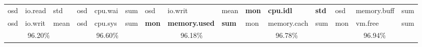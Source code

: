 \begin{table*}[t!]
{\begin{tabular}{|lll|lll|lll|lll|lll|}
osd  & io.read       & std  & osd  & cpu.wai       & sum  & osd   & io.writ        & mean   & \textbf{mon}    & \textbf{cpu.idl}         & \textbf{std}    & osd    & memory.buff     & sum    \\
osd  & io.writ       & mean & osd  & cpu.sys       & sum  & \textbf{mon}   & \textbf{memory.used}    & \textbf{sum}    & mon    & memory.cach     & sum    & mon    & vm.free         & sum    \\
\hline
\multicolumn{3}{|c|}{96.20\%} & \multicolumn{3}{c|}{96.60\%} & \multicolumn{3}{c|}{96.18\%}     & \multicolumn{3}{c|}{96.78\%}       & \multicolumn{3}{c|}{96.94\%} \\
\hline
\end{tabular}
}
\end{table*}